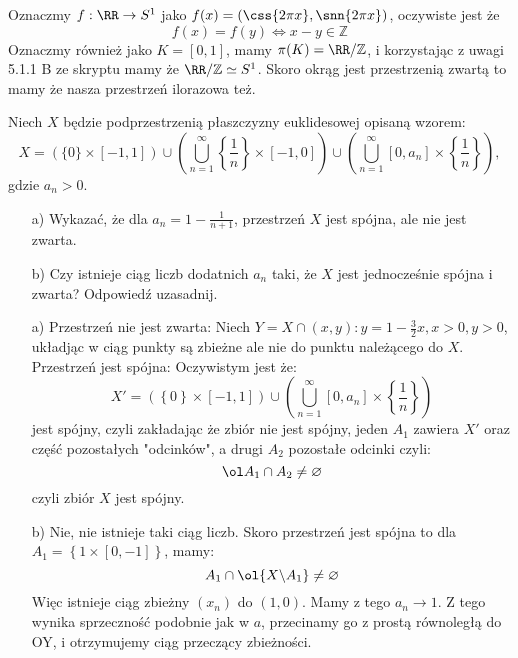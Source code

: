 \documentclass[11pt]{scrartcl}
\begin{document}
    Oznaczmy $f: \RR \to S^1$ jako $f(x) = (\css{2 \pi x}, \snn{2 \pi x})$, oczywiste jest że 
    $$
      f(x) = f(y) \iff  x - y \in \mathbb{Z}
    $$ 
    Oznaczmy również jako $K = [0,1]$, mamy $\pi (K) = \RR / \mathbb{Z}$, i korzystając z uwagi 5.1.1 B ze skryptu mamy że $\RR / \mathbb{Z} \simeq S^1$. Skoro okrąg jest przestrzenią zwartą to mamy że nasza przestrzeń ilorazowa też. 
    
    \begin{zadanie*}
        Niech $X$ będzie podprzestrzenią płaszczyzny euklidesowej opisaną wzorem:
        \[
            X = (\{0\} \times [-1, 1]) \cup \left( \bigcup_{n=1}^\infty \left\{ \frac{1}{n} \right\} \times [-1, 0] \right) \cup \left( \bigcup_{n=1}^\infty [0, a_n] \times \left\{ \frac{1}{n} \right\} \right),
        \]
        gdzie $a_n > 0$.
        \begin{itemize}
            \item[a)] Wykazać, że dla $a_n = 1 - \frac{1}{n+1}$, przestrzeń $X$ jest spójna, ale nie jest zwarta.
            \item[b)] Czy istnieje ciąg liczb dodatnich $a_n$ taki, że $X$ jest jednocześnie spójna i zwarta? Odpowiedź uzasadnij.
        \end{itemize}
    \end{zadanie*}

    \begin{itemize}
      \item[a)]
         Przestrzeń nie jest zwarta:
         Niech $Y = X \cap {(x,y) : y = 1 - \frac{3}{2} x, x > 0, y > 0}$, układjąc w ciąg punkty są zbieżne ale nie do punktu należącego do $X$.
         Przestrzeń jest spójna:
         Oczywistym jest że:
        \[
          X' = \left ( \left \{ 0 \right \} \times [-1, 1] \right ) \cup \left( \bigcup_{n=1}^\infty [0, a_n] \times \left\{ \frac{1}{n} \right\} \right)
        \]
        jest spójny, czyli zakładając że zbiór nie jest spójny, jeden $A_1$ zawiera $X'$ oraz część pozostałych "odcinków", a drugi $A_2$ pozostałe odcinki czyli:
        \[
            \ol A_1 \cap A_2 \not = \varnothing
        \]
        czyli zbiór $X$ jest spójny.

      \item[b)]
        Nie, nie istnieje taki ciąg liczb. Skoro przestrzeń jest spójna to dla $A_1 = \left \{ 1 \times [0, -1] \right \}$, mamy:
        \[
          A_1 \cap \ol{X \backslash A_1} \not = \varnothing
        \]
        Więc istnieje ciąg zbieżny $(x_n)$ do $(1, 0)$. Mamy z tego $a_n \to 1$. Z tego wynika sprzeczność podobnie jak w $a$, przecinamy go z prostą równoległą do OY, i otrzymujemy ciąg przeczący zbieżności.
        

        
    \end{itemize}
    
\end{document}
